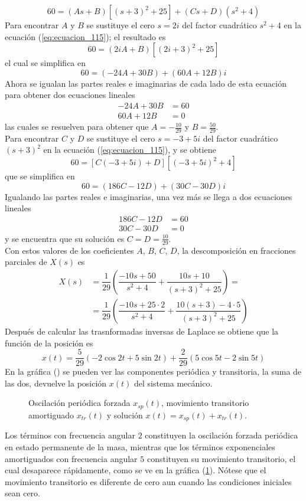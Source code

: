 \begin{equation}
60 = (As + B) [(s+3)^{2} + 25] + (Cs + D)(s^{2} + 4)
\label{eq:ecuacion_115}
\end{equation}
Para encontrar $A$ y $B$ se sustituye el cero $s = 2i$ del factor cuadrático $s^{2} + 4$ en la ecuación (\ref{eq:ecuacion_115}); el resultado es
\[ 60 = (2iA + B)[(2i + 3)^{2} + 25] \]
el cual se simplifica en
\[ 60 = (-24 A + 30 B) + (60 A + 12 B)i \]
Ahora se igualan las partes reales e imaginarias de cada lado de esta ecuación para obtener dos ecuaciones lineales
\[  \begin{split}
-24 A + 30 B &= 60 \\
60 A + 12 B &= 0
\end{split} \]
las cuales se resuelven para obtener que $A=- \frac{10}{29}$ y $B = \frac{50}{29}$.
\\
Para encontrar $C$ y $D$ se sustituye el cero $s=-3 + 5i$ del factor cuadrático $(s+3)^{2}$ en la ecuación (\ref{eq:ecuacion_115}), y se obtiene
\[ 60 = [C (-3 +  5i) + D][(-3 + 5i)^{2} + 4] \]
que se simplifica en
\[ 60 = (186 C -12 D) + (30 C - 30 D) i \]
Igualando las partes reales e imaginarias, una vez más se llega a dos ecuaciones lineales
\[  \begin{split}
186 C - 12 D &= 60 \\
30 C - 30 D &= 0
\end{split} \]
y se encuentra que su solución es $C = D = \frac{10}{29}$.
\\
Con estos valores de los coeficientes $A$, $B$, $C$, $D$, la descomposición en fracciones parciales de $X(s)$ es
\[  \begin{split}
X(s) &= \dfrac{1}{29} \left( \dfrac{-10 s + 50}{s^{2} + 4} + \dfrac{10 s + 10}{(s + 3)^{2} + 25} \right) = \\
&= \dfrac{1}{29} \left( \dfrac{-10 s + 25 \cdot 2}{s^{2} + 4} + \dfrac{10 (s+3) - 4 \cdot 5}{(s+3)^{2} + 25} \right)
\end{split} \]
Después de calcular las trasnformadas inversas de Laplace se obtiene que la función de la posición es
\[ x(t) = \dfrac{5}{29} ( - 2 \cos 2t  + 5  \sin 2t ) + \dfrac{2}{29} (5 \cos 5t - 2 \sin 5t) \]
En la gráfica () se pueden ver las componentes periódica y transitoria, la suma de las dos, devuelve la posición $x(t)$ del sistema mecánico.
\begin{figure}[H]
\centering

\label{fig:figura_010}
\caption{Oscilación periódica forzada $x_{sp}(t)$, movimiento transitorio amortiguado $x_{tr}(t)$ y solución $x(t) =x_{sp}(t) + x_{tr}(t)$.}
\end{figure}
Los términos con frecuencia angular $2$ constituyen la oscilación forzada periódica en estado permanente de la masa, mientras que los términos exponenciales amortiguados con frecuencia angular $5$ constituyen su movimiento transitorio, el cual desaparece rápidamente, como se ve en la gráfica (\ref{fig:figura_010}). Nótese que el movimiento transitorio es diferente de cero aun cuando las condiciones iniciales sean cero.

